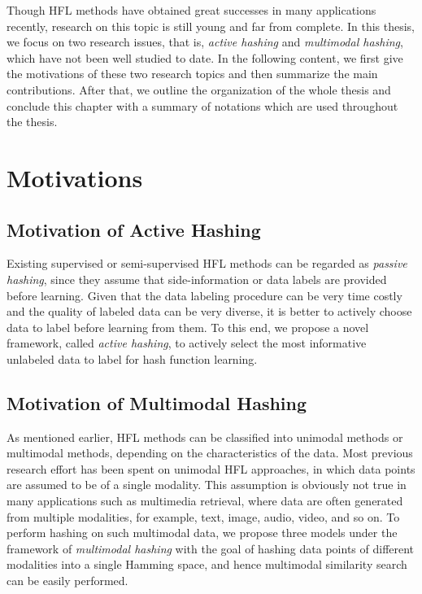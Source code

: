 Though \mbox{HFL} methods have obtained great successes in many applications recently, research on this topic is still young and far from complete. In this thesis, we focus on two research issues, that is, \textit{active hashing} and \textit{multimodal hashing}, which have not been well studied to date. In the following content, we first give the motivations of these two research topics and then summarize the main contributions. After that, we outline the organization of the whole thesis and conclude this chapter with a summary of notations which are used throughout the thesis. 


\section{Motivations}


\subsection{Motivation of Active Hashing} 
Existing supervised or semi-supervised \mbox{HFL} methods can be regarded as \textit{passive hashing}, since they assume that side-information or data labels are provided before learning. Given that the data labeling procedure can be very time costly and the quality of labeled data can be very diverse, it is better to actively choose data to label before learning from them. To this end, we propose a novel framework, called \textit{active hashing}, to actively select the most informative unlabeled data to label for hash function learning.

\subsection{Motivation of Multimodal Hashing}
As mentioned earlier, \mbox{HFL} methods can be classified into unimodal methods or multimodal methods, depending on the characteristics of the data. Most previous research effort has been spent on unimodal \mbox{HFL} approaches, in which data points are assumed to be of a single modality. This assumption is obviously not true in many applications such as multimedia retrieval, where data are often generated from multiple modalities, for example, text, image, audio, video, and so on. To perform hashing on such multimodal data, we propose three models under the framework of \textit{multimodal hashing} with the goal of hashing data points of different modalities into a single Hamming space, and hence multimodal similarity search can be easily performed.

